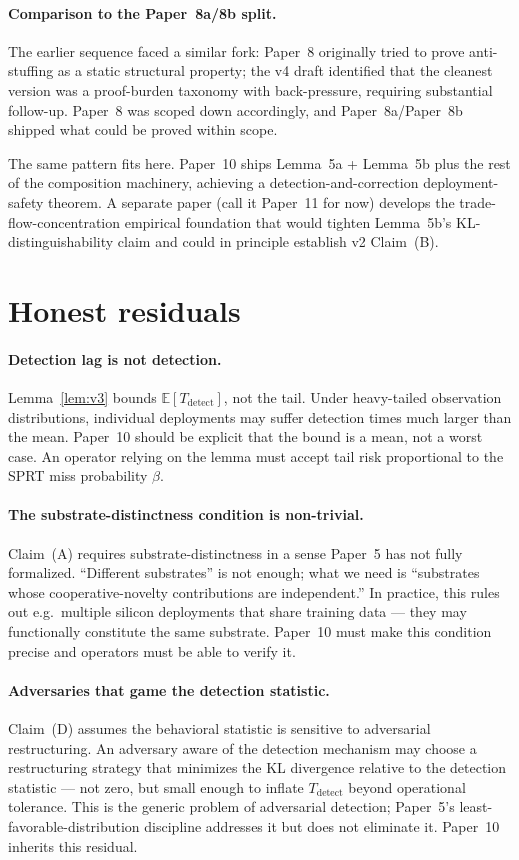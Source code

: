 \documentclass{article}
\begin{document}
\paragraph{Comparison to the Paper~8a/8b split.}
The earlier sequence faced a similar fork: Paper~8 originally tried to
prove anti-stuffing as a static structural property; the v4 draft
identified that the cleanest version was a proof-burden taxonomy with
back-pressure, requiring substantial follow-up.  Paper~8 was scoped
down accordingly, and Paper~8a/Paper~8b shipped what could be proved
within scope.

The same pattern fits here.  Paper~10 ships Lemma~5a + Lemma~5b plus
the rest of the composition machinery, achieving a
detection-and-correction deployment-safety theorem.  A separate paper
(call it Paper~11 for now) develops the trade-flow-concentration
empirical foundation that would tighten Lemma~5b's KL-distinguishability
claim and could in principle establish v2 Claim~(B).

\section{Honest residuals}

\paragraph{Detection lag is not detection.}
Lemma~\ref{lem:v3} bounds $\mathbb{E}[T_{\mathrm{detect}}]$, not the tail.
Under heavy-tailed observation distributions, individual deployments may
suffer detection times much larger than the mean.  Paper~10 should be
explicit that the bound is a mean, not a worst case.  An operator
relying on the lemma must accept tail risk proportional to the SPRT miss
probability $\beta$.

\paragraph{The substrate-distinctness condition is non-trivial.}
Claim~(A) requires substrate-distinctness in a sense Paper~5 has not
fully formalized.  ``Different substrates'' is not enough; what we need
is ``substrates whose cooperative-novelty contributions are
independent.''  In practice, this rules out e.g.\ multiple silicon
deployments that share training data --- they may functionally constitute
the same substrate.  Paper~10 must make this condition precise and
operators must be able to verify it.

\paragraph{Adversaries that game the detection statistic.}
Claim~(D) assumes the behavioral statistic is sensitive to adversarial
restructuring.  An adversary aware of the detection mechanism may
choose a restructuring strategy that minimizes the KL divergence
relative to the detection statistic --- not zero, but small enough to
inflate $T_{\mathrm{detect}}$ beyond operational tolerance.  This is the
generic problem of adversarial detection; Paper~5's
least-favorable-distribution discipline addresses it but does not
eliminate it.  Paper~10 inherits this residual.
\end{document}
